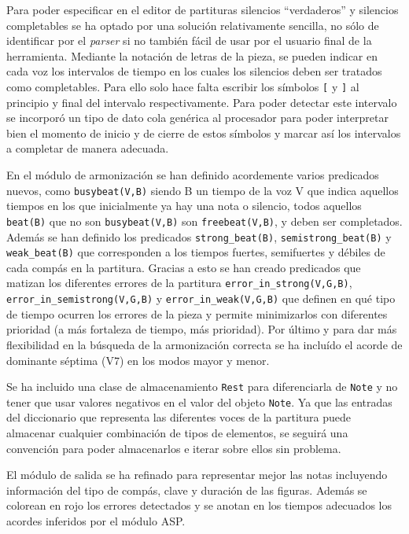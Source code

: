 Para poder especificar en el editor de partituras silencios ``verdaderos'' y silencios completables se ha optado por una solución relativamente sencilla, no sólo de identificar por el \textit{parser} si no también fácil de usar por el usuario final de la herramienta. Mediante la notación de letras de la pieza, se pueden indicar en cada voz los intervalos de tiempo en los cuales los silencios deben ser tratados como completables. Para ello solo hace falta escribir los símbolos \texttt{[} y \texttt{]} al principio y final del intervalo respectivamente. Para poder detectar este intervalo se incorporó un tipo de dato cola genérica al procesador para poder interpretar bien el momento de inicio y de cierre de estos símbolos y marcar así los intervalos a completar de manera adecuada.

En el módulo de armonización se han definido acordemente varios predicados nuevos, como \texttt{busybeat(V,B)} siendo B un tiempo de la voz V que indica aquellos tiempos en los que inicialmente ya hay una nota o silencio, todos aquellos \texttt{beat(B)} que no son \texttt{busybeat(V,B)} son \texttt{freebeat(V,B)}, y deben ser completados. Además se han definido los predicados \texttt{strong\_beat(B)}, \texttt{semistrong\_beat(B)} y \texttt{weak\_beat(B)} que corresponden a los tiempos fuertes, semifuertes y débiles de cada compás en la partitura. Gracias a esto se han creado predicados que matizan los diferentes errores de la partitura \texttt{error\_in\_strong(V,G,B)}, \texttt{error\_in\_semistrong(V,G,B)} y \texttt{error\_in\_weak(V,G,B)} que definen en qué tipo de tiempo ocurren los errores de la pieza y permite minimizarlos con diferentes prioridad (a más fortaleza de tiempo, más prioridad). Por último y para dar más flexibilidad en la búsqueda de la armonización correcta se ha incluído el acorde de dominante séptima (V7) en los modos mayor y menor.

Se ha incluido una clase de almacenamiento \texttt{Rest} para diferenciarla de \texttt{Note} y no tener que usar valores negativos en el valor del objeto \texttt{Note}. Ya que las entradas del diccionario que representa las diferentes voces de la partitura puede almacenar cualquier combinación de tipos de elementos, se seguirá una convención para poder almacenarlos e iterar sobre ellos sin problema.

El módulo de salida se ha refinado para representar mejor las notas incluyendo información del tipo de compás, clave y duración de las figuras. Además se colorean en rojo los errores detectados y se anotan en los tiempos adecuados los acordes inferidos por el módulo ASP.

